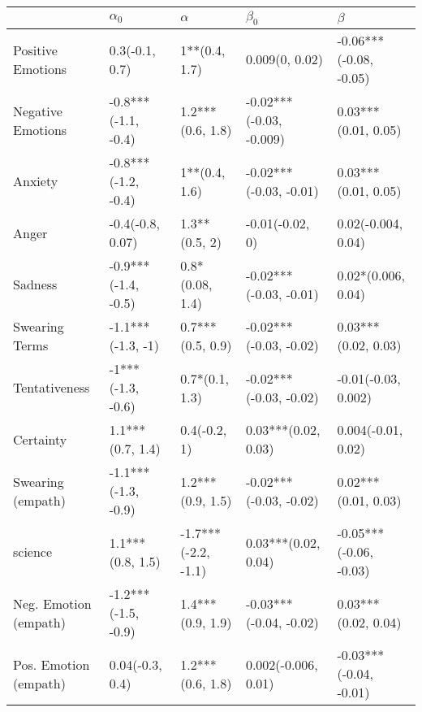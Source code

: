 \begin{tabular}{lllll}
\toprule
{} &           $\alpha_0$ &             $\alpha$ &                $\beta_0$ &                 $\beta$ \\
\midrule
Positive Emotions     &       0.3(-0.1, 0.7) &        1**(0.4, 1.7) &           0.009(0, 0.02) &  -0.06***(-0.08, -0.05) \\
Negative Emotions     &  -0.8***(-1.1, -0.4) &     1.2***(0.6, 1.8) &  -0.02***(-0.03, -0.009) &     0.03***(0.01, 0.05) \\
Anxiety               &  -0.8***(-1.2, -0.4) &        1**(0.4, 1.6) &   -0.02***(-0.03, -0.01) &     0.03***(0.01, 0.05) \\
Anger                 &     -0.4(-0.8, 0.07) &        1.3**(0.5, 2) &          -0.01(-0.02, 0) &      0.02(-0.004, 0.04) \\
Sadness               &  -0.9***(-1.4, -0.5) &      0.8*(0.08, 1.4) &   -0.02***(-0.03, -0.01) &      0.02*(0.006, 0.04) \\
Swearing Terms        &    -1.1***(-1.3, -1) &     0.7***(0.5, 0.9) &   -0.02***(-0.03, -0.02) &     0.03***(0.02, 0.03) \\
Tentativeness         &    -1***(-1.3, -0.6) &       0.7*(0.1, 1.3) &   -0.02***(-0.03, -0.02) &     -0.01(-0.03, 0.002) \\
Certainty             &     1.1***(0.7, 1.4) &         0.4(-0.2, 1) &      0.03***(0.02, 0.03) &      0.004(-0.01, 0.02) \\
Swearing (empath)     &  -1.1***(-1.3, -0.9) &     1.2***(0.9, 1.5) &   -0.02***(-0.03, -0.02) &     0.02***(0.01, 0.03) \\
science               &     1.1***(0.8, 1.5) &  -1.7***(-2.2, -1.1) &      0.03***(0.02, 0.04) &  -0.05***(-0.06, -0.03) \\
Neg. Emotion (empath) &  -1.2***(-1.5, -0.9) &     1.4***(0.9, 1.9) &   -0.03***(-0.04, -0.02) &     0.03***(0.02, 0.04) \\
Pos. Emotion (empath) &      0.04(-0.3, 0.4) &     1.2***(0.6, 1.8) &      0.002(-0.006, 0.01) &  -0.03***(-0.04, -0.01) \\
\bottomrule
\end{tabular}
